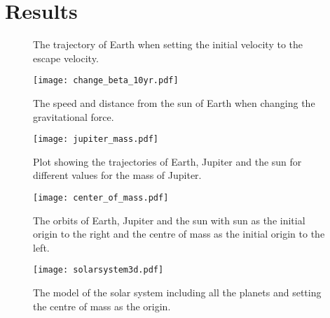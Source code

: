 \section{Results}
\label{sec:results}

\begin{figure}[htbp]
	\centering
	\caption{The trajectory of Earth when setting the initial velocity to the escape velocity.}
	\label{fig:earth escape}
\end{figure}

\begin{figure}[htbp]
	\centering
	\texttt{[image: change\_beta\_10yr.pdf]}
	\caption{The speed and distance from the sun of Earth when changing the gravitational force.}
	\label{fig:changing beta}
\end{figure}

\begin{figure}[htbp]
	\centering
	\texttt{[image: jupiter\_mass.pdf]}
	\caption{Plot showing the trajectories of Earth, Jupiter and the sun for different values for the mass of Jupiter.}
	\label{fig:jupiter mass}
\end{figure}

\begin{figure}[htbp]
	\centering
	\texttt{[image: center\_of\_mass.pdf]}
	\caption{The orbits of Earth, Jupiter and the sun with sun as the initial origin to the right and the centre of mass as the initial origin to the left.}
	\label{fig:centre of mass}
\end{figure}

\begin{figure}[htbp]
	\centering
	\texttt{[image: solarsystem3d.pdf]}
	\caption{The model of the solar system including all the planets and setting the centre of mass as the origin.}
	\label{fig:solar system}
\end{figure}
